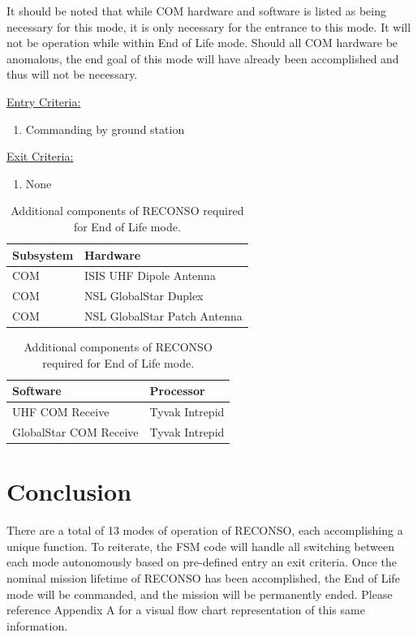 \documentclass{article}
\begin{document}
It should be noted that while COM hardware and software is listed as being necessary for this mode, it is only necessary for the entrance to this mode. It will not be operation while within End of Life mode. Should all COM hardware be anomalous, the end goal of this mode will have already been accomplished and thus will not be necessary.

\underline{Entry Criteria:} 

\begin{enumerate}
\item Commanding by ground station
\end{enumerate}

\underline{Exit Criteria:}

\begin{enumerate}
\item None
\end{enumerate}

\begin{table}[h!]
\caption{Additional components of RECONSO required for End of Life mode.}
\begin{adjustbox}{center}
\begin{tabular}{|l|l|}
\hline
Subsystem & Hardware \\ \hline \hline
COM & ISIS UHF Dipole Antenna  \\ \hline
COM & NSL GlobalStar Duplex  \\ \hline
COM & NSL GlobalStar Patch Antenna \\ \hline
\end{tabular}

\quad

\begin{tabular}{|l|l|}
\hline
Software & Processor \\ \hline \hline
UHF COM Receive & Tyvak Intrepid \\ \hline
GlobalStar COM Receive & Tyvak Intrepid \\ \hline
\end{tabular}
\end{adjustbox}
\end{table}

\section{Conclusion}

There are a total of 13 modes of operation of RECONSO, each accomplishing a unique function. To reiterate, the FSM code will handle all switching between each mode autonomously based on pre-defined entry an exit criteria. Once the nominal mission lifetime of RECONSO has been accomplished, the End of Life mode will be commanded, and the mission will be permanently ended. Please reference Appendix A for a visual flow chart representation of this same information.
\end{document}

